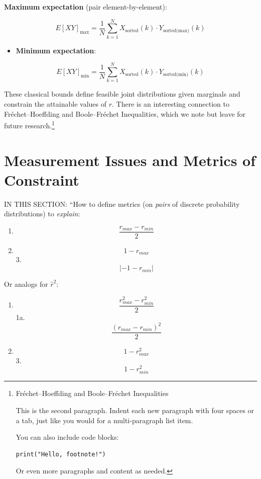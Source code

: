 \documentclass[
  12pt,
]{article}
\providecommand{\tightlist}{%
  \setlength{\itemsep}{0pt}\setlength{\parskip}{0pt}}\usepackage{longtable,booktabs,array}
\theoremstyle{plain}
\theoremstyle{definition}
\theoremstyle{remark}
\begin{document}
\textbf{Maximum expectation} (pair element-by-element):

\[E[XY]_{\text{max}} = \frac{1}{N}\sum_{k=1}^{N} X_{\text{sorted}}(k)\cdot Y_{\text{sorted(max)}}(k)\]

\begin{itemize}
\tightlist
\item
  \textbf{Minimum expectation}:
\end{itemize}

\[E[XY]_{\text{min}} = \frac{1}{N}\sum_{k=1}^{N} X_{\text{sorted}}(k)\cdot Y_{\text{sorted(min)}}(k)\]

These classical bounds define feasible joint distributions given
marginals and constrain the attainable values of \(r\). There is an
interesting connection to Fréchet--Hoeffding and Boole--Fréchet
Inequalities, which we note but leave for future research.\footnote{Fréchet--Hoeffding
  and Boole--Fréchet Inequalities

  This is the second paragraph. Indent each new paragraph with four
  spaces or a tab, just like you would for a multi-paragraph list item.

  You can also include code blocks:

\begin{Verbatim}
print("Hello, footnote!")
\end{Verbatim}

  Or even more paragraphs and content as needed.}

\section{Measurement Issues and Metrics of
Constraint}\label{measurement-issues-and-metrics-of-constraint}

IN THIS SECTION: ``How to define metrics (on \emph{pairs} of discrete
probability distributions) to \emph{explain}:

\begin{enumerate}
\def\labelenumi{\arabic{enumi}.}
\tightlist
\item
  \[\frac{ r_{max}-r_{min}}{2}\]
\item
  \[1-r_{max}\] 3.\[|-1-r_{min}|\]
\end{enumerate}

Or analogs for \(\hat{r}^2\):

\begin{enumerate}
\def\labelenumi{\arabic{enumi}.}
\tightlist
\item
  \[\frac{ r_{max}^2-r_{min}^2}{2}\] 1a.
  \[\frac{ (r_{max}-r_{min})^2}{2}\]
\item
  \[1-r_{max}^2\] 3.\[1-r_{min}^2\]
\end{enumerate}
\end{document}
